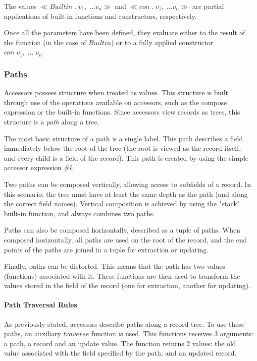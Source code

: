 \documentclass{article}
\begin{document}
The values $\ll Builtin \; . \; v_1, \; \dots v_n \gg$ and $\ll con \; . \; v_1, \; \dots v_n \gg$ are partial applications of built-in functions and constructors, respectively.

Once all the parameters have been defined, they evaluate either to the result of the function (in the case of $Builtin$) or to a fully applied constructor $con \; v_1, \; \dots \; v_n$.

\subsubsection{Paths}

Accessors possess structure when treated as values.
This structure is built through use of the operations available on accessors, such as the compose expression or the built-in functions.
Since accessors view records as trees, this structure is a \emph{path} along a tree.

The most basic structure of a path is a single label.
This path describes a field immediately below the root of the tree (the root is viewed as the record itself, and every child is a field of the record).
This path is created by using the simple accessor expression $\#l$.

Two paths can be composed vertically, allowing access to subfields of a record.
In this scenario, the tree must have at least the same depth as the path (and along the correct field names).
Vertical composition is achieved by using the "stack" built-in function, and always combines two paths.

Paths can also be composed horizontally, described as a tuple of paths.
When composed horizontally, all paths are used on the root of the record, and the end points of the paths are joined in a tuple for extraction or updating.

Finally, paths can be distorted.
This means that the path has two values (functions) associated with it.
These functions are then used to transform the values stored in the field of the record (one for extraction, another for updating).

\paragraph{Path Traversal Rules}

As previously stated, accessors describe paths along a record tree.
To use these paths, an auxiliary $traverse$ function is used.
This functions receives 3 arguments: a path, a record and an update value.
The function returns 2 values: the old value associated with the field specified by the path; and an updated record.
\end{document}

